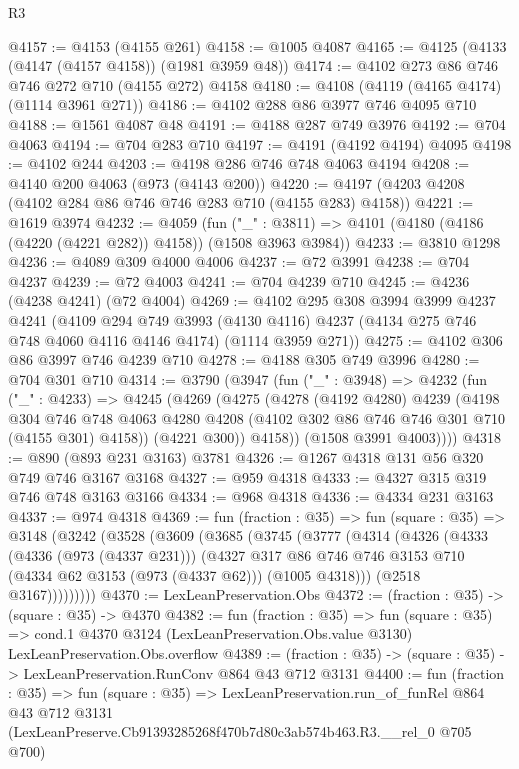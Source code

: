 \begin{lexlean}{R3}
\begin{coremodule}
@4157 := @4153 (@4155 @261)
@4158 := @1005 @4087
@4165 := @4125 (@4133 (@4147 (@4157 @4158)) (@1981 @3959 @48))
@4174 := @4102 @273 @86 @746 @746 @272 @710 (@4155 @272) @4158
@4180 := @4108 (@4119 (@4165 @4174) (@1114 @3961 @271))
@4186 := @4102 @288 @86 @3977 @746 @4095 @710
@4188 := @1561 @4087 @48
@4191 := @4188 @287 @749 @3976
@4192 := @704 @4063
@4194 := @704 @283 @710
@4197 := @4191 (@4192 @4194) @4095
@4198 := @4102 @244
@4203 := @4198 @286 @746 @748 @4063 @4194
@4208 := @4140 @200 @4063 (@973 (@4143 @200))
@4220 := @4197 (@4203 @4208 (@4102 @284 @86 @746 @746 @283 @710 (@4155 @283) @4158))
@4221 := @1619 @3974
@4232 := @4059
    (fun ("_" : @3811) => @4101 (@4180 (@4186 (@4220 (@4221 @282)) @4158)) (@1508 @3963 @3984))
@4233 := @3810 @1298
@4236 := @4089 @309 @4000 @4006
@4237 := @72 @3991
@4238 := @704 @4237
@4239 := @72 @4003
@4241 := @704 @4239 @710
@4245 := @4236 (@4238 @4241) (@72 @4004)
@4269 := @4102
    @295
    @308
    @3994
    @3999
    @4237
    @4241
    (@4109
      @294
      @749
      @3993
      (@4130 @4116)
      @4237
      (@4134 @275 @746 @748 @4060 @4116 @4146 @4174)
      (@1114 @3959 @271))
@4275 := @4102 @306 @86 @3997 @746 @4239 @710
@4278 := @4188 @305 @749 @3996
@4280 := @704 @301 @710
@4314 := @3790
    (@3947
      (fun ("_" : @3948) =>
      @4232
        (fun ("_" : @4233) =>
        @4245
          (@4269
            (@4275
              (@4278
                (@4192 @4280)
                @4239
                (@4198
                  @304
                  @746
                  @748
                  @4063
                  @4280
                  @4208
                  (@4102 @302 @86 @746 @746 @301 @710 (@4155 @301) @4158))
                (@4221 @300))
              @4158))
          (@1508 @3991 @4003))))
@4318 := @890 (@893 @231 @3163) @3781
@4326 := @1267 @4318 @131 @56 @320 @749 @746 @3167 @3168
@4327 := @959 @4318
@4333 := @4327 @315 @319 @746 @748 @3163 @3166
@4334 := @968 @4318
@4336 := @4334 @231 @3163
@4337 := @974 @4318
@4369 := fun (fraction : @35) =>
  fun (square : @35) =>
  @3148
    (@3242
      (@3528
        (@3609
          (@3685
            (@3745
              (@3777
                (@4314
                  (@4326
                    (@4333
                      (@4336 (@973 (@4337 @231)))
                      (@4327
                        @317
                        @86
                        @746
                        @746
                        @3153
                        @710
                        (@4334 @62 @3153 (@973 (@4337 @62)))
                        (@1005 @4318)))
                    (@2518 @3167)))))))))
@4370 := LexLeanPreservation.Obs
@4372 := (fraction : @35) -> (square : @35) -> @4370
@4382 := fun (fraction : @35) =>
  fun (square : @35) =>
  cond.{1} @4370 @3124 (LexLeanPreservation.Obs.value @3130) LexLeanPreservation.Obs.overflow
@4389 := (fraction : @35) -> (square : @35) -> LexLeanPreservation.RunConv @864 @43 @712 @3131
@4400 := fun (fraction : @35) =>
  fun (square : @35) =>
  LexLeanPreservation.run_of_funRel
    @864
    @43
    @712
    @3131
    (LexLeanPreserve.Cb91393285268f470b7d80c3ab574b463.R3.__rel_0 @705 @700)
\end{coremodule}
\end{lexlean}
